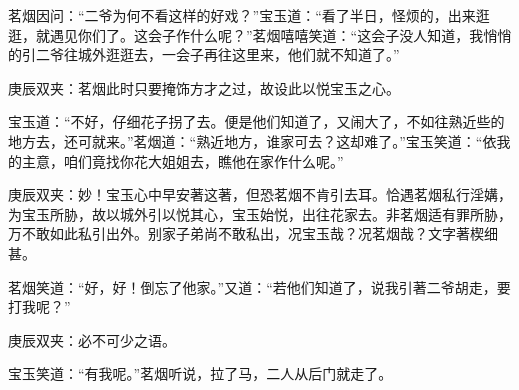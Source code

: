 \begin{parag}
    茗烟因问：“二爷为何不看这样的好戏？”宝玉道：“看了半日，怪烦的，出来逛逛，就遇见你们了。这会子作什么呢？”茗烟嘻嘻笑道：“这会子没人知道，我悄悄的引二爷往城外逛逛去，一会子再往这里来，他们就不知道了。”\begin{note}庚辰双夹：茗烟此时只要掩饰方才之过，故设此以悦宝玉之心。\end{note}宝玉道：“不好，仔细花子拐了去。便是他们知道了，又闹大了，不如往熟近些的地方去，还可就来。”茗烟道：“熟近地方，谁家可去？这却难了。”宝玉笑道：“依我的主意，咱们竟找你花大姐姐去，瞧他在家作什么呢。”\begin{note}庚辰双夹：妙！宝玉心中早安著这著，但恐茗烟不肯引去耳。恰遇茗烟私行淫媾，为宝玉所胁，故以城外引以悦其心，宝玉始悦，出往花家去。非茗烟适有罪所胁，万不敢如此私引出外。别家子弟尚不敢私出，况宝玉哉？况茗烟哉？文字著楔细甚。\end{note}茗烟笑道：“好，好！倒忘了他家。”又道：“若他们知道了，说我引著二爷胡走，要打我呢？”\begin{note}庚辰双夹：必不可少之语。\end{note}宝玉笑道：“有我呢。”茗烟听说，拉了马，二人从后门就走了。
\end{parag}


